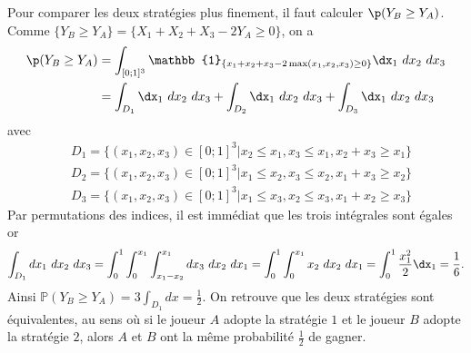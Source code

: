{\begin{enumerate}
{		Pour comparer les deux stratégies plus finement, il faut calculer $\p(Y_B\geq Y_A)$. \\
		Comme $\{Y_B\geq Y_A\}=\{X_1+X_2+X_3-2Y_A\geq 0\}$, on a 
		\begin{align*}
			\p(Y_B\geq Y_A)&=\int_{[0;1]^3} \mathbb{1}_{\{x_1+x_2+x_3-2\max(x_1,x_2,x_3)\geq 0\}}\dx_1 \  dx_2 \ dx_3 \\ 
			&=\int_{D_1} \dx_1 \  dx_2 \ dx_3 +\int_{D_2} \dx_1 \  dx_2 \ dx_3 + \int_{D_3} \dx_1 \  dx_2 \ dx_3
		\end{align*}
		avec
		\begin{align*}
			&D_1=\{ (x_1,x_2,x_3)\in[0;1]^3 | x_2\leq x_1, x_3\leq x_1, x_2+x_3\geq x_1\} \\
			&D_2=\{ (x_1,x_2,x_3)\in[0;1]^3 | x_1\leq x_2, x_3\leq x_2, x_1+x_3\geq x_2\} \\
			&D_3=\{ (x_1,x_2,x_3)\in[0;1]^3 | x_1\leq x_3, x_2\leq x_3, x_1+x_2\geq x_3\} 
		\end{align*}
		Par permutations des indices, il est immédiat que les trois intégrales sont égales or
		\begin{align*}
			\int_{D_1} dx_1\ dx_2 \ dx_3 
			= \int_0^1 \int_0^{x_1} \int_{x_1-x_2}^{x_1} dx_3 \ dx_2\ dx_1
			= \int_0^1 \int_0^{x_1} x_2 \ dx_2\ dx_1
			=\int_0^1 \frac{x_1^2}{2} \dx_1
			=\frac{1}{6}.
		\end{align*}
		Ainsi $\mathbb{P}(Y_B\geq Y_A)=3\int_{D_1} dx=\frac{1}{2}$.
		On retrouve que les deux stratégies sont équivalentes, au sens où si le joueur $A$ adopte la stratégie $1$ et le joueur $B$ adopte la stratégie $2$, alors $A$ et $B$ ont la même probabilité $\frac{1}{2}$ de gagner.}
\end{enumerate}}
